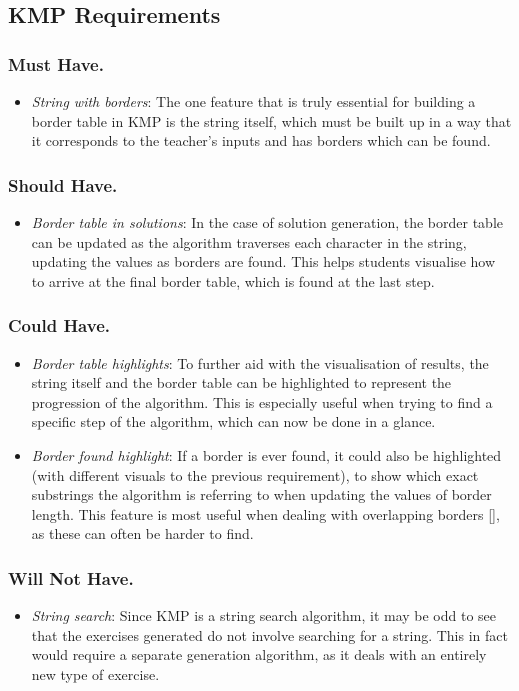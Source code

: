 \documentclass{l4proj}
\begin{document}
\subsection{KMP Requirements}
\subsubsection{Must Have.}
\begin{itemize}
	\item
	\emph{String with borders}: The one feature that is truly essential for building a border table in KMP is the string itself, which must be built up in a way that it corresponds to the teacher's inputs and has borders which can be found. 
\end{itemize}
\subsubsection{Should Have.}
\begin{itemize}
	\item
	\emph{Border table in solutions}: In the case of solution generation, the border table can be updated as the algorithm traverses each character in the string, updating the values as borders are found. This helps students visualise how to arrive at the final border table, which is found at the last step.
\end{itemize}
\subsubsection{Could Have.}
\begin{itemize}
	\item
	\emph{Border table highlights}: To further aid with the visualisation of results, the string itself and the border table can be highlighted to represent the progression of the algorithm. This is especially useful when trying to find a specific step of the algorithm, which can now be done in a glance.
	\item
	\emph{Border found highlight}: If a border is ever found, it could also be highlighted (with different visuals to the previous requirement), to show which exact substrings the algorithm is referring to when updating the values of border length. This feature is most useful when dealing with overlapping borders \autoref{}, as these can often be harder to find.
 \end{itemize}
\subsubsection{Will Not Have.}
\begin{itemize}
	\item
	\emph{String search}: Since KMP is a string search algorithm, it may be odd to see that the exercises generated do not involve searching for a string. This in fact would require a separate generation algorithm, as it deals with an entirely new type of exercise.
\end{itemize}
\end{document}
